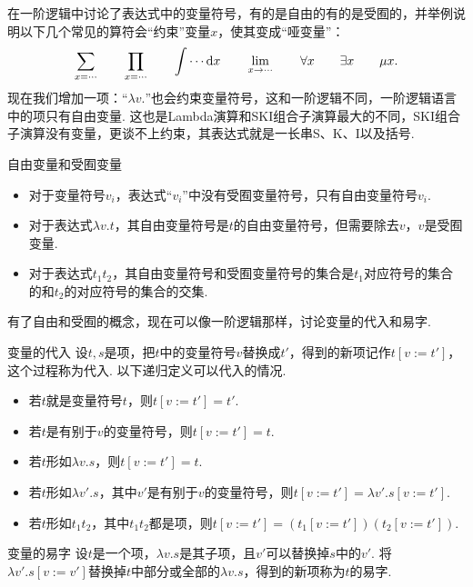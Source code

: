 在一阶逻辑中讨论了表达式中的变量符号，有的是自由的有的是受囿的，并举例说明以下几个常见的算符会“约束”变量\(x\)，使其变成“哑变量”：
\[\sum_{x=\cdots} \qquad \prod_{x=\cdots} \qquad \int \cdots {\rm d}x \qquad \lim_{x \to \cdots} \qquad \forall x \qquad \exists x \qquad \mu x.\]
现在我们增加一项：“\(\lambda v.\)”也会约束变量符号，这和一阶逻辑不同，一阶逻辑语言中的项只有自由变量. 这也是Lambda演算和SKI组合子演算最大的不同，SKI组合子演算没有变量，更谈不上约束，其表达式就是一长串S、K、I以及括号.

\begin{definition}{自由变量和受囿变量}
    \begin{itemize}
        \item 对于变量符号\(v_i\)，表达式“\(v_i\)”中没有受囿变量符号，只有自由变量符号\(v_i\).
        \item 对于表达式\(\lambda v.t\)，其自由变量符号是\(t\)的自由变量符号，但需要除去\(v\)，\(v\)是受囿变量.
        \item 对于表达式\(t_1 t_2\)，其自由变量符号和受囿变量符号的集合是\(t_1\)对应符号的集合的和\(t_2\)的对应符号的集合的交集.
    \end{itemize}
\end{definition}

有了自由和受囿的概念，现在可以像一阶逻辑那样，讨论变量的代入和易字.

\begin{definition}{变量的代入}
    设\(t,s\)是项，把\(t\)中的变量符号\(v\)替换成\(t'\)，得到的新项记作\(t[v:=t']\)，这个过程称为代入. 以下递归定义可以代入的情况.
    \begin{itemize}
        \item 若\(t\)就是变量符号\(t\)，则\(t[v:=t']=t'\).
        \item 若\(t\)是有别于\(v\)的变量符号，则\(t[v:=t']=t\).
        \item 若\(t\)形如\(\lambda v.s\)，则\(t[v:=t']=t\).
        \item 若\(t\)形如\(\lambda v'.s\)，其中\(v'\)是有别于\(v\)的变量符号，则\(t[v:=t']=\lambda v'.s[v:=t']\).
        \item 若\(t\)形如\(t_1 t_2\)，其中\(t_1 t_2\)都是项，则\(t[v:=t']=(t_1[v:=t'])(t_2[v:=t'])\).
    \end{itemize}
\end{definition}

\begin{definition}{变量的易字}
    设\(t\)是一个项，\(\lambda v.s\)是其子项，且\(v'\)可以替换掉\(s\)中的\(v'\). 将\(\lambda v'.s[v:=v']\)替换掉\(t\)中部分或全部的\(\lambda v.s\)，得到的新项称为\(t\)的易字.
\end{definition}

